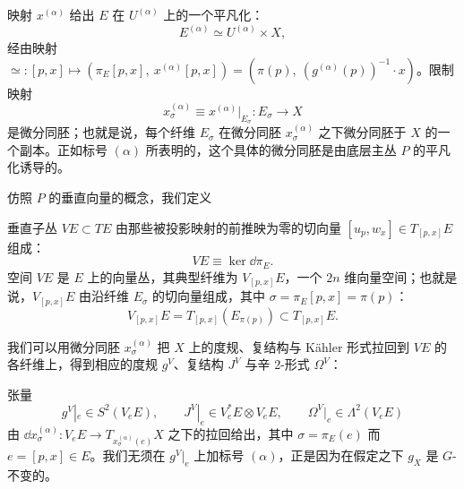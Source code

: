 映射 $x^{(\alpha)}$ 给出 $E$ 在 $U^{(\alpha)}$ 上的一个平凡化：
\[ E^{(\alpha)}\simeq U^{(\alpha)}\times X, \]
经由映射 $\simeq: [p,x]\mapsto(\pi_E[p,x],\ x^{(\alpha)}[p,x]) = (\pi(p),\ (g^{(\alpha)}(p))^{-1}\cdot x)$。限制映射
\[ x^{(\alpha)}_\sigma \equiv x^{(\alpha)}|_{E_\sigma}: E_\sigma\to X \]
是微分同胚；也就是说，每个纤维 $E_\sigma$ 在微分同胚 $x^{(\alpha)}_\sigma$ 之下微分同胚于 $X$ 的一个副本。正如标号 $(\alpha)$ 所表明的，这个具体的微分同胚是由底层主丛 $P$ 的平凡化诱导的。


仿照 $P$ 的垂直向量的概念，我们定义

\begin{definition}
垂直子丛 $VE\subset TE$ 由那些被投影映射的前推映为零的切向量 $[u_p,w_x]\in T_{[p,x]}E$ 组成：
\[ VE \equiv \ker \dd\pi_E . \]
空间 $VE$ 是 $E$ 上的向量丛，其典型纤维为 $V_{[p,x]}E$，一个 $2n$ 维向量空间；也就是说，$V_{[p,x]}E$ 由沿纤维 $E_\sigma$ 的切向量组成，其中 $\sigma=\pi_E[p,x]=\pi(p)$：
\[ V_{[p,x]}E = T_{[p,x]}(E_{\pi(p)})\subset T_{[p,x]}E . \]
\end{definition}


我们可以用微分同胚 $x^{(\alpha)}_\sigma$ 把 $X$ 上的度规、复结构与 Kähler 形式拉回到 $VE$ 的各纤维上，得到相应的度规 $g^V$、复结构 $J^V$ 与辛 2-形式 $\Omega^V$：

\begin{definition}
张量
\[
    g^V|_e\in S^2(V_eE),\qquad J^V|_e\in V_e^*E\otimes V_eE,\qquad \Omega^V|_e\in\Lambda^2(V_eE)
\]
由 $\dd x^{(\alpha)}_\sigma: V_eE\to T_{x^{(\alpha)}_\sigma(e)}X$ 之下的拉回给出，其中 $\sigma=\pi_E(e)$ 而 $e=[p,x]\in E$。我们无须在 $g^V|_e$ 上加标号 $(\alpha)$，正是因为在假定之下 $g_X$ 是 $G$-不变的。
\end{definition}



